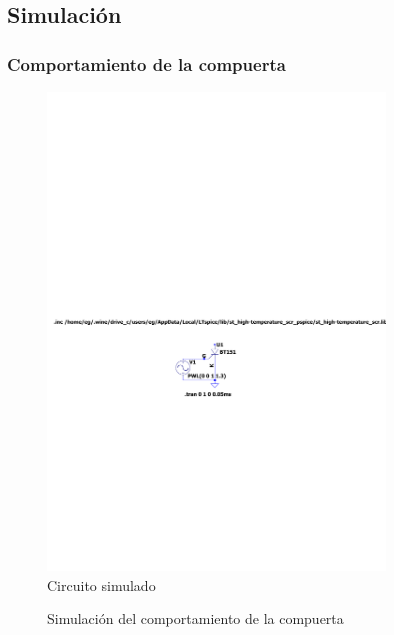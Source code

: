 \subsection{Simulación}
\subsubsection{Comportamiento de la compuerta}
\begin{figure}[H]
  \begin{center}
    \includegraphics[width=0.8\textwidth, clip, trim=5cm 10.5cm 6cm 15cm]{inc/sim/SegundaParteA.pdf}
  \end{center}
  \caption{Circuito simulado}
\end{figure}
\begin{figure}[H]
\begin{center}
\end{center}
\caption{Simulación del comportamiento de la compuerta}
\end{figure}
